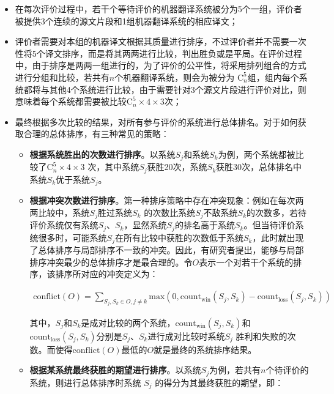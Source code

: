 \begin{itemize}
\vspace{0.5em}
\item 在每次评价过程中，若干个等待评价的机器翻译系统被分为5个一组，评价者被提供3个连续的源文片段和1组机器翻译系统的相应译文；
\vspace{0.5em}
\item 评价者需要对本组的机器译文根据其质量进行排序，不过评价者并不需要一次性将5个译文排序，而是将其两两进行比较，判出胜负或是平局。在评价过程中，由于排序是两两一组进行的，为了评价的公平性，将采用排列组合的方式进行分组和比较，若共有$n$个机器翻译系统，则会为被分为 $\textrm{C}_n^5$组，组内每个系统都将与其他4个系统进行比较，由于需要针对3个源文片段进行评价对比，则意味着每个系统都需要被比较$\textrm{C}_n^5 \times 4 \times 3$次；
\vspace{0.5em}
\item 最终根据多次比较的结果，对所有参与评价的系统进行总体排名。对于如何获取合理的总体排序，有三种常见的策略：
    \begin{itemize}
    \item {\small\sffamily\bfseries{根据系统胜出的次数进行排序}}。以系统${S}_j$和系统${S}_k$为例，两个系统都被比较了$\textrm{C}_n^5 \times 4 \times 3$ 次，其中系统${S}_j$获胜20次，系统${S}_k$获胜30次，总体排名中系统${S}_k$优于系统${S}_j$。
    \item  {\small\sffamily\bfseries{根据冲突次数进行排序}}。第一种排序策略中存在冲突现象：例如在每次两两比较中，系统${S}_j$胜过系统${S}_k$ 的次数比系统${S}_j$不敌系统${S}_k$的次数多，若待评价系统仅有系统${S}_j$、${S}_k$，显然系统${S}_j$的排名高于系统${S}_k$。但当待评价系统很多时，可能系统${S}_j$在所有比较中获胜的次数低于系统${S}_k$，此时就出现了总体排序与局部排序不一致的冲突。因此，有研究者提出，能够与局部排序冲突最少的总体排序才是最合理的。令$O$表示一个对若干个系统的排序，该排序所对应的冲突定义为：

\begin{eqnarray}
\textrm{conflict}(O) =\sum\limits_{{{S}_j},{{S}_k} \in O,j \ne k} {{\textrm{max}}(0,\textrm{count}_{\textrm{win}}({{S}_j},{{S}_k}) - \textrm{count}_{\textrm{loss}}({{S}_j},{{S}_k}))}
\label{eq:4-1}
\end{eqnarray}

其中，${S}_j$和${S}_k$是成对比较的两个系统，$\textrm{count}_{\textrm{win}}({S}_j,{S}_k)$和$\textrm{count}_{\textrm{loss}}({S}_j,{S}_k)$分别是${S}_j$、${S}_k$进行成对比较时系统${S}_j$ 胜利和失败的次数。而使得$\textrm{conflict}(O)$最低的$O$就是最终的系统排序结果。
    \item {\small\sffamily\bfseries{根据某系统最终获胜的期望进行排序}}。以系统${S}_j$为例，若共有$n$个待评价的系统，则进行总体排序时系统 ${S}_j$ 的得分为其最终获胜的期望，即：


\end{itemize}
\end{itemize}
